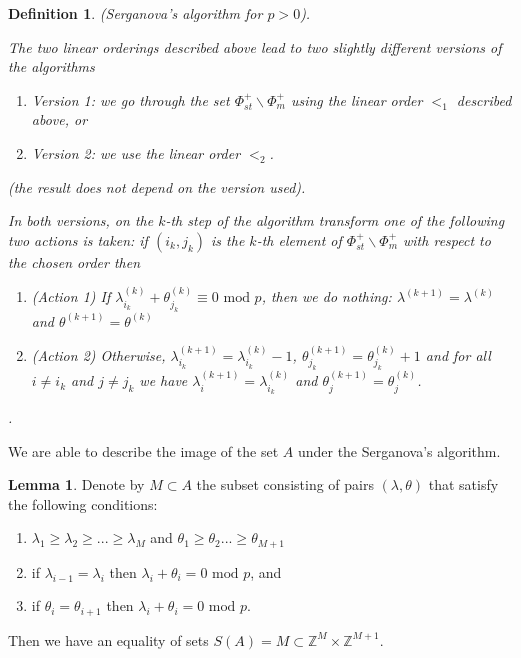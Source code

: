 \documentclass[12pt]{amsart}
\numberwithin{equation}{section}
\numberwithin{equation}{section}
\newtheorem{definition}[thm]{Definition}
\theoremstyle{definition}
\newtheorem{lemma}[theorem]{Lemma}
\begin{document}
\begin{definition}
    (Serganova's algorithm for $p > 0$). 
    
    The two linear orderings described above lead to two slightly different versions of the algorithms
    \begin{enumerate}
        \item Version 1: we go through the set $\Phi^+_{st}\backslash \Phi^+_m$ using the linear order $<_1$ described above, or
        \item Version 2: we use the linear order $<_2$.
    \end{enumerate}    
    (the result does not depend on the version used).
    
    In both versions, on the $k$-th step of the algorithm transform one of the following two actions is taken: if $(i_k,j_k)$ is the $k$-th element of $\Phi^+_{st}\backslash \Phi^+_m$ with respect to the chosen order then 
    \begin{enumerate}
        \item (Action 1) If $\lambda^{(k)}_{i_k}+\theta^{(k)}_{j_k} \equiv 0 \text{ mod }p$, then we do nothing: $\lambda^{(k+1)} = \lambda^{(k)}$ and $\theta^{(k+1)}=\theta^{(k)}$
        \item (Action 2) Otherwise, $\lambda^{(k+1)}_{i_k} = \lambda^{(k)}_{i_k}-1$, $\theta^{(k+1)}_{j_k}=\theta^{(k)}_{j_k}+1$ and for all $i\neq i_k$ and $j \neq j_k$ we have $\lambda^{(k+1)}_{i} = \lambda^{(k)}_{i_k}$ and $\theta^{(k+1)}_{j}=\theta^{(k)}_{j}$.
    \end{enumerate}.
\end{definition}

We are able to describe the image of the set $A$ under the Serganova's algorithm.

\begin{lemma}
Denote by $M \subset A$ the subset consisting of pairs $(\lambda, \theta)$ that satisfy the following  conditions:
\begin{enumerate}
    \item $\lambda_1 \ge \lambda_2 \ge ... \ge \lambda_M$ and $\theta_1\ge \theta_2 ... \ge \theta_{M+1}$
    \item if $\lambda_{i-1} =\lambda_i$ then $\lambda_i+\theta_i=0 \text{ mod }p$, and
    \item if $\theta_{i} =\theta_{i+1}$ then $\lambda_i+\theta_i=0 \text{ mod }p$.
\end{enumerate}

    Then we have an equality of sets $S(A)=M \subset \mathbb{Z}^M\times\mathbb{Z}^{M+1}$.
\end{lemma}
\end{document}
